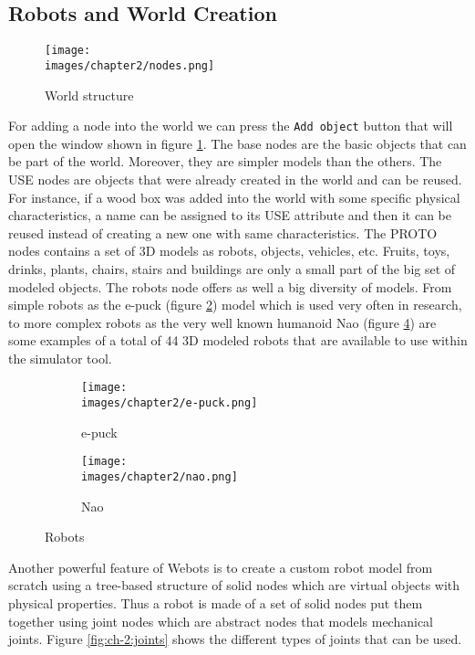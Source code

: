 \subsection{Robots and World Creation}

\begin{figure}[h!]
  \centering
  \texttt{[image: \\images/chapter2/nodes.png]}
  \caption{World structure}
  \label{fig:ch-2:nodes}
\end{figure}

For adding a node into the world we can press the \verb|Add object| button that will open the window shown in figure \ref{fig:ch-2:nodes}. The base nodes are the basic objects that can be part of the world. Moreover, they are simpler models than the others. The USE nodes are objects that were already created in the world and can be reused. For instance, if a wood box was added into the world with some specific physical characteristics, a name can be assigned to its USE attribute and then it can be reused instead of creating a new one with same characteristics. The PROTO nodes contains a set of 3D models as robots, objects, vehicles, etc. Fruits, toys, drinks, plants, chairs, stairs and buildings are only a small part of the big set of modeled objects. The robots node offers as well a big diversity of models. From simple robots as the e-puck (figure \ref{fig:ch-2:e-puck}) model which is used very often in research, to more complex robots as the very well known humanoid Nao (figure \ref{fig:ch-2:nao}) are some examples of a total of 44 3D modeled robots that are available to use within the simulator tool. 

\begin{figure}[h!]
  \centering
  \begin{subfigure}[b]{0.3\linewidth}
  	\texttt{[image: \\images/chapter2/e-puck.png]}
  	\caption{e-puck}
  	\label{fig:ch-2:e-puck}
  \end{subfigure}
  \begin{subfigure}[b]{0.35\linewidth}
  	\texttt{[image: \\images/chapter2/nao.png]}
  	\caption{Nao}
  	\label{fig:ch-2:nao}
  \end{subfigure}
  \caption{Robots}
\end{figure}

Another powerful feature of Webots is to create a custom robot model from scratch using a tree-based structure of solid nodes which are virtual objects with physical properties. Thus a robot is made of a set of solid nodes put them together using joint nodes which are abstract nodes that models mechanical joints. Figure \ref{fig:ch-2:joints} shows the different types of joints that can be used.

